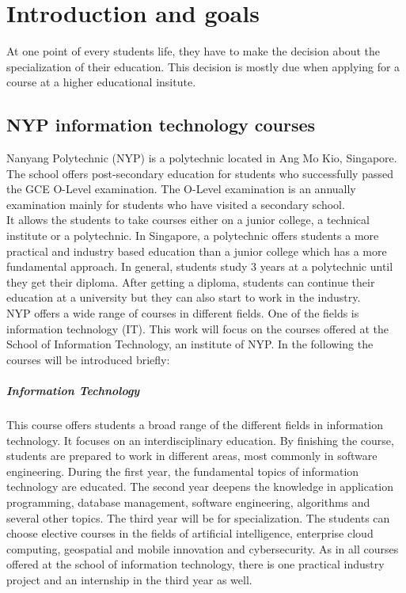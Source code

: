 \chapter{Introduction and goals}
At one point of every students life, they have to make the decision about the specialization of their education. This decision is mostly due when applying for a course at a higher educational insitute. 
\section{NYP information technology courses}
Nanyang Polytechnic (NYP) is a polytechnic located in Ang Mo Kio, Singapore. The school offers post-secondary education for students who successfully passed the GCE O-Level examination. The O-Level examination is an annually examination mainly for students who have visited a secondary school. \cite{aboutOLevel} \\ 
It allows the students to take courses either on a junior college, a technical institute or a polytechnic. In Singapore, a polytechnic offers students a more practical and industry based education than a junior college which has a more fundamental approach. In general, students study 3 years at a polytechnic until they get their diploma. After getting a diploma, students can continue their education at a university but they can also start to work in the industry. \cite{schoolSystem}\\
NYP offers a wide range of courses in different fields. One of the fields is information technology (IT). This work will focus on the courses offered at the School of Information Technology, an institute of NYP. In the following the courses will be introduced briefly: \cite{nypCourses}

\paragraph{Information Technology}
This course offers students a broad range of the different fields in information technology. It focuses on an interdisciplinary education. By finishing the course, students are prepared to work in different areas, most commonly in software engineering. During the first year, the fundamental topics of information technology are educated. The second year deepens the knowledge in application programming, database management, software engineering, algorithms and several other topics. The third year will be for specialization. The students can choose elective courses in the fields of artificial intelligence, enterprise cloud computing, geospatial and mobile innovation and cybersecurity. As in all courses offered at the school of information technology, there is one practical industry project and an internship in the third year as well.

